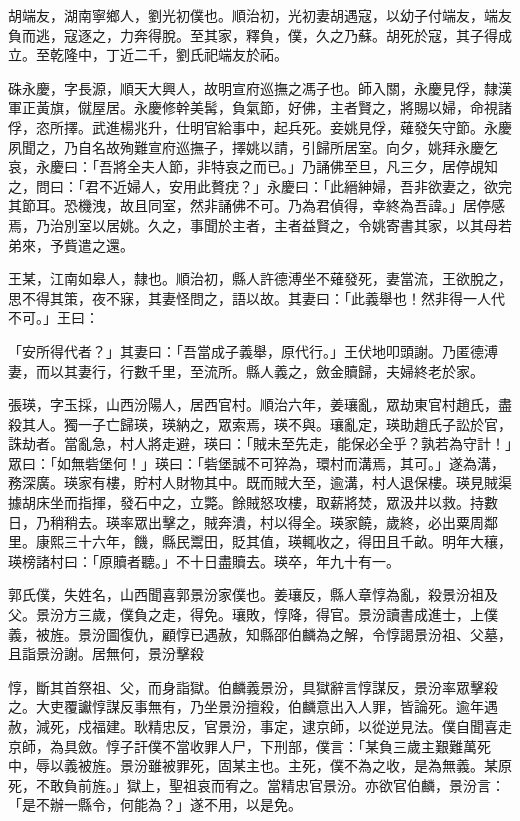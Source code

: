 \begin{pinyinscope}
胡端友，湖南寧鄉人，劉光初僕也。順治初，光初妻胡遇寇，以幼子付端友，端友負而逃，寇逐之，力奔得脫。至其家，釋負，僕，久之乃蘇。胡死於寇，其子得成立。至乾隆中，丁近二千，劉氏祀端友於祏。

硃永慶，字長源，順天大興人，故明宣府巡撫之馮子也。師入關，永慶見俘，隸漢軍正黃旗，僦屋居。永慶修幹美髯，負氣節，好佛，主者賢之，將賜以婦，命視諸俘，恣所擇。武進楊兆升，仕明官給事中，起兵死。妾姚見俘，薙發矢守節。永慶夙聞之，乃自名故殉難宣府巡撫子，擇姚以請，引歸所居室。向夕，姚拜永慶乞哀，永慶曰：「吾將全夫人節，非特哀之而已。」乃誦佛至旦，凡三夕，居停覘知之，問曰：「君不近婦人，安用此贅疣？」永慶曰：「此縉紳婦，吾非欲妻之，欲完其節耳。恐機洩，故且同室，然非誦佛不可。乃為君偵得，幸終為吾諱。」居停感焉，乃治別室以居姚。久之，事聞於主者，主者益賢之，令姚寄書其家，以其母若弟來，予貲遣之還。

王某，江南如皋人，隸也。順治初，縣人許德溥坐不薙發死，妻當流，王欲脫之，思不得其策，夜不寐，其妻怪問之，語以故。其妻曰：「此義舉也！然非得一人代不可。」王曰：

「安所得代者？」其妻曰：「吾當成子義舉，原代行。」王伏地叩頭謝。乃匿德溥妻，而以其妻行，行數千里，至流所。縣人義之，斂金贖歸，夫婦終老於家。

張瑛，字玉採，山西汾陽人，居西官村。順治六年，姜瓖亂，眾劫東官村趙氏，盡殺其人。獨一子亡歸瑛，瑛納之，眾索焉，瑛不與。瓖亂定，瑛助趙氏子訟於官，誅劫者。當亂急，村人將走避，瑛曰：「賊未至先走，能保必全乎？孰若為守計！」眾曰：「如無砦堡何！」瑛曰：「砦堡誠不可猝為，環村而溝焉，其可。」遂為溝，務深廣。瑛家有樓，貯村人財物其中。既而賊大至，逾溝，村人退保樓。瑛見賊渠據胡床坐而指揮，發石中之，立斃。餘賊怒攻樓，取薪將焚，眾汲井以救。持數日，乃稍稍去。瑛率眾出擊之，賊奔潰，村以得全。瑛家饒，歲終，必出粟周鄰里。康熙三十六年，饑，縣民鬻田，貶其值，瑛輒收之，得田且千畝。明年大穰，瑛榜諸村曰：「原贖者聽。」不十日盡贖去。瑛卒，年九十有一。

郭氏僕，失姓名，山西聞喜郭景汾家僕也。姜瓖反，縣人章惇為亂，殺景汾祖及父。景汾方三歲，僕負之走，得免。瓖敗，惇降，得官。景汾讀書成進士，上僕義，被旌。景汾圖復仇，顧惇已遇赦，知縣邵伯麟為之解，令惇謁景汾祖、父墓，且詣景汾謝。居無何，景汾擊殺

惇，斷其首祭祖、父，而身詣獄。伯麟義景汾，具獄辭言惇謀反，景汾率眾擊殺之。大吏覆讞惇謀反事無有，乃坐景汾擅殺，伯麟意出入人罪，皆論死。逾年遇赦，減死，戍福建。耿精忠反，官景汾，事定，逮京師，以從逆見法。僕自聞喜走京師，為具斂。惇子訐僕不當收罪人尸，下刑部，僕言：「某負三歲主艱難萬死中，辱以義被旌。景汾雖被罪死，固某主也。主死，僕不為之收，是為無義。某原死，不敢負前旌。」獄上，聖祖哀而宥之。當精忠官景汾。亦欲官伯麟，景汾言：「是不辦一縣令，何能為？」遂不用，以是免。


\end{pinyinscope}
